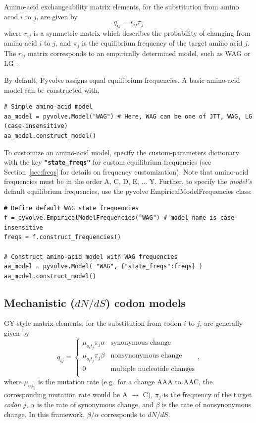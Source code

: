\documentclass{article}
\newcommand{\code}[1]{\textbf{\texttt{\small{#1}}}}
\begin{document}
Amino-acid exchangeability matrix elements, for the substitution from amino acod $i$ to $j$, are given by 
\begin{equation}
q_{ij} = r_{ij} \pi_j
\end{equation}
where $r_{ij}$ is a symmetric matrix which describes the probability of changing from amino acid $i$ to $j$, and $\pi_j$ is the equilibrium frequency of the target amino acid $j$. The $r_{ij}$ matrix corresponds to an empirically determined model, such as WAG \citep{WAG} or LG \citep{LG}. 

By default, Pyvolve assigns equal equilibrium frequencies. A basic amino-acid model can be constructed with, 
\begin{lstlisting}
# Simple amino-acid model 
aa_model = pyvolve.Model("WAG") # Here, WAG can be one of JTT, WAG, LG (case-insensitive)
aa_model.construct_model()
\end{lstlisting}

To customize an amino-acid model, specify the custom-parameters dictionary with the key \code{"state\_freqs"} for custom equilibrium frequencies (see Section~\ref{sec:freqs} for details on frequency customization). Note that amino-acid frequencies must be in the order A, C, D, E, ... Y. Further, to specify the \textit{model's} default equilibrium frequencies, use the pyvolve EmpiricalModelFrequencies class:
\begin{lstlisting}
# Define default WAG state frequencies
f = pyvolve.EmpiricalModelFrequencies("WAG") # model name is case-insensitive
freqs = f.construct_frequencies()

# Construct amino-acid model with WAG frequencies
aa_model = pyvolve.Model( "WAG", {"state_freqs":freqs} )
aa_model.construct_model()
\end{lstlisting}



\subsection{Mechanistic ($dN/dS$) codon models}\label{sec:mechcodon_basic}

GY-style \citep{GY94} matrix elements, for the substitution from codon $i$ to $j$, are generally given by 
\begin{equation}\label{eq:GY94}
q_{ij} = \left\{ 
\begin{array}{rl}
\mu_{o_it_j} \pi_j \alpha      & \text{synonymous change} \\
\mu_{o_it_j} \pi_j \beta       & \text{nonsynonymous change} \\
0                    & \text{multiple nucleotide changes} \\             
\end{array} \right.,
\end{equation}
where $\mu_{o_it_j}$ is the mutation rate (e.g.\ for a change AAA to AAC, the corresponding mutation rate would be A $\rightarrow$ C), $\pi_j$ is the frequency of the target \emph{codon} $j$, $\alpha$ is the rate of synonymous change, and $\beta$ is the rate of nonsynonymous change. In this framework, $\beta / \alpha$ corresponds to $dN/dS$.
\end{document}
